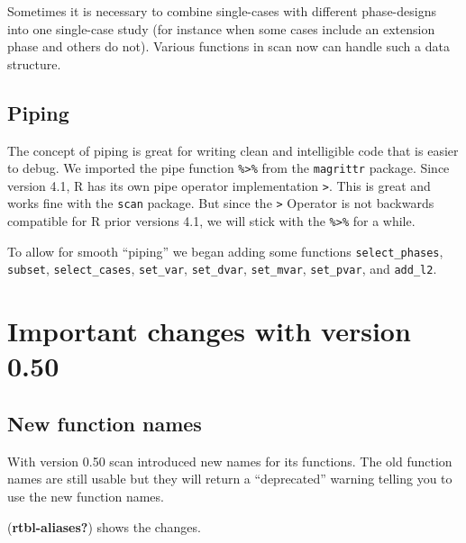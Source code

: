 \documentclass[
  letterpaper,
  DIV=11,
  numbers=noendperiod]{scrreprt}
\begin{document}
Sometimes it is necessary to combine single-cases with different
phase-designs into one single-case study (for instance when some cases
include an extension phase and others do not). Various functions in scan
now can handle such a data structure.

\hypertarget{piping}{%
\subsection{Piping}\label{piping}}

The concept of piping is great for writing clean and intelligible code
that is easier to debug. We imported the pipe function
\texttt{\%\textgreater{}\%} from the \texttt{magrittr} package. Since
version 4.1, R has its own pipe operator implementation
\texttt{\textbar{}\textgreater{}}. This is great and works fine with the
\texttt{scan} package. But since the \texttt{\textbar{}\textgreater{}}
Operator is not backwards compatible for R prior versions 4.1, we will
stick with the \texttt{\%\textgreater{}\%} for a while.

To allow for smooth ``piping'' we began adding some functions
\texttt{select\_phases}, \texttt{subset}, \texttt{select\_cases},
\texttt{set\_var}, \texttt{set\_dvar}, \texttt{set\_mvar},
\texttt{set\_pvar}, and \texttt{add\_l2}.

\hypertarget{important-changes-with-version-0.50}{%
\section{Important changes with version
0.50}\label{important-changes-with-version-0.50}}

\hypertarget{new-function-names}{%
\subsection{New function names}\label{new-function-names}}

With version 0.50 scan introduced new names for its functions. The old
function names are still usable but they will return a ``deprecated''
warning telling you to use the new function names.

(\textbf{rtbl-aliases?}) shows the changes.
\end{document}
